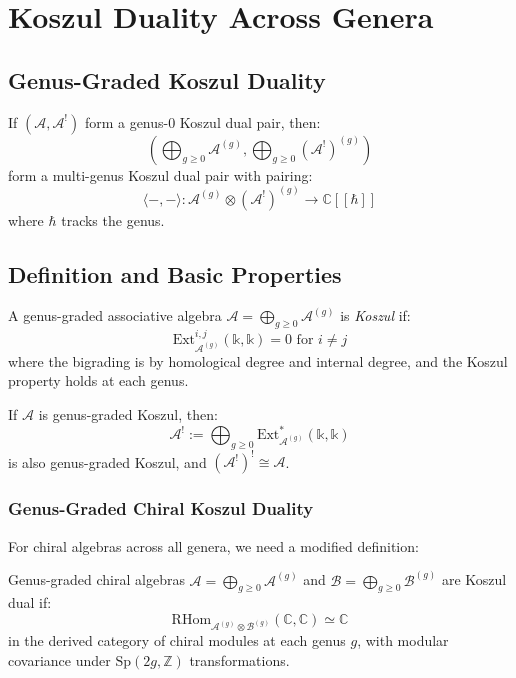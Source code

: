 \appendix
\chapter{Koszul Duality Across Genera}

\section{Genus-Graded Koszul Duality}

\begin{theorem}
If $(\mathcal{A}, \mathcal{A}^!)$ form a genus-0 Koszul dual pair, then:
$$\left(\bigoplus_{g \geq 0} \mathcal{A}^{(g)}, \bigoplus_{g \geq 0} (\mathcal{A}^!)^{(g)}\right)$$
form a multi-genus Koszul dual pair with pairing:
$$\langle -, - \rangle: \mathcal{A}^{(g)} \otimes (\mathcal{A}^!)^{(g)} \to \mathbb{C}[\![\hbar]\!]$$
where $\hbar$ tracks the genus.
\end{theorem}

\section{Definition and Basic Properties}

\begin{definition}
A genus-graded associative algebra $\mathcal{A} = \bigoplus_{g \geq 0} \mathcal{A}^{(g)}$ is \emph{Koszul} if:
$$\text{Ext}_{\mathcal{A}^{(g)}}^{i,j}(\mathbb{k}, \mathbb{k}) = 0 \text{ for } i \neq j$$
where the bigrading is by homological degree and internal degree, and the Koszul property holds at each genus.
\end{definition}

\begin{theorem}
If $\mathcal{A}$ is genus-graded Koszul, then:
$$\mathcal{A}^! := \bigoplus_{g \geq 0} \text{Ext}_{\mathcal{A}^{(g)}}^*(\mathbb{k}, \mathbb{k})$$
is also genus-graded Koszul, and $(\mathcal{A}^!)^! \cong \mathcal{A}$.
\end{theorem}

\subsection{Genus-Graded Chiral Koszul Duality}

For chiral algebras across all genera, we need a modified definition:

\begin{definition}
Genus-graded chiral algebras $\mathcal{A} = \bigoplus_{g \geq 0} \mathcal{A}^{(g)}$ and $\mathcal{B} = \bigoplus_{g \geq 0} \mathcal{B}^{(g)}$ are Koszul dual if:
$$\text{RHom}_{\mathcal{A}^{(g)} \otimes \mathcal{B}^{(g)}}(\mathbb{C}, \mathbb{C}) \simeq \mathbb{C}$$
in the derived category of chiral modules at each genus $g$, with modular covariance under $\text{Sp}(2g, \mathbb{Z})$ transformations.
\end{definition}

